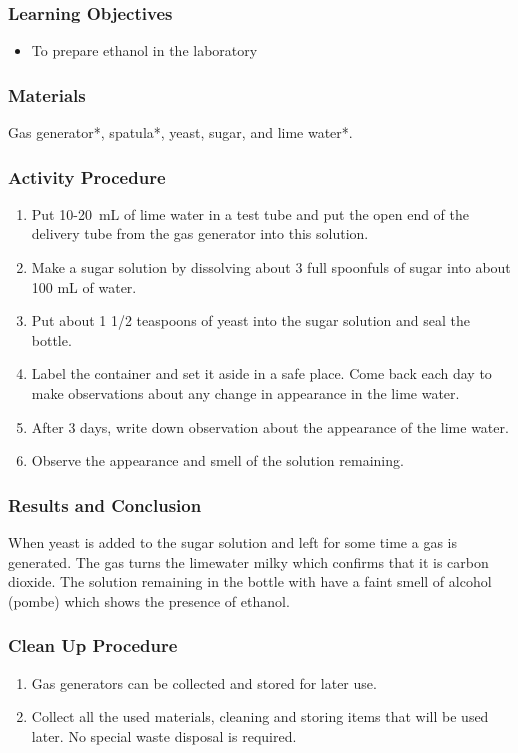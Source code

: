 \subsubsection*{Learning Objectives}
\begin{itemize}
\item{To prepare ethanol in the laboratory}
\end{itemize}

\subsubsection*{Materials}
Gas generator*, spatula*, yeast, sugar, and lime water*.

\subsubsection*{Activity Procedure}
\begin{enumerate}

\item{Put 10-20~mL of lime water in a test tube and put the open end of the delivery tube from the gas generator into this solution.}
\item{Make a sugar solution by dissolving about 3 full spoonfuls of sugar into about 100 mL of water.}
\item{Put about 1 1/2 teaspoons of yeast into the sugar solution and seal the bottle.}
\item{Label the container and set it aside in a safe place. Come back each day to make observations about any change in appearance in the lime water.}
\item{After 3 days, write down observation about the appearance of the lime water.}
\item{Observe the appearance and smell of the solution remaining.}
\end{enumerate}

\subsubsection*{Results and Conclusion}
When yeast is added to the sugar solution and left for some time a gas is generated. The gas turns the limewater milky which confirms that it is carbon dioxide. The solution remaining in the bottle with have a faint smell of alcohol (pombe) which shows the presence of ethanol.

\subsubsection*{Clean Up Procedure}
\begin{enumerate}
\item{Gas generators can be collected and stored for later use.}
\item{Collect all the used materials, cleaning and storing items that will be used later. No special waste disposal is required.}
\end{enumerate}

